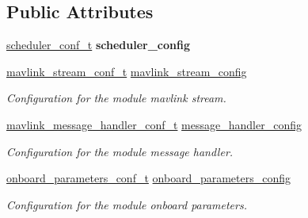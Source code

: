 \subsection*{Public Attributes}
\begin{DoxyCompactItemize}
\item 
\hypertarget{structmavlink__communication__conf__t_a91a616821d00de2f494815fb6c199c69}{\hyperlink{structscheduler__conf__t}{scheduler\+\_\+conf\+\_\+t} {\bfseries scheduler\+\_\+config}}\label{structmavlink__communication__conf__t_a91a616821d00de2f494815fb6c199c69}

\item 
\hypertarget{structmavlink__communication__conf__t_a72829ddb14533048c3fa186c352cb651}{\hyperlink{structmavlink__stream__conf__t}{mavlink\+\_\+stream\+\_\+conf\+\_\+t} \hyperlink{structmavlink__communication__conf__t_a72829ddb14533048c3fa186c352cb651}{mavlink\+\_\+stream\+\_\+config}}\label{structmavlink__communication__conf__t_a72829ddb14533048c3fa186c352cb651}

\begin{DoxyCompactList}\small\item\em Configuration for the module mavlink stream. \end{DoxyCompactList}\item 
\hypertarget{structmavlink__communication__conf__t_a508838ffec8764bd89d3028ef65bd963}{\hyperlink{structmavlink__message__handler__conf__t}{mavlink\+\_\+message\+\_\+handler\+\_\+conf\+\_\+t} \hyperlink{structmavlink__communication__conf__t_a508838ffec8764bd89d3028ef65bd963}{message\+\_\+handler\+\_\+config}}\label{structmavlink__communication__conf__t_a508838ffec8764bd89d3028ef65bd963}

\begin{DoxyCompactList}\small\item\em Configuration for the module message handler. \end{DoxyCompactList}\item 
\hypertarget{structmavlink__communication__conf__t_a1637ef0fa3ca36b09f611bc5071fb089}{\hyperlink{structonboard__parameters__conf__t}{onboard\+\_\+parameters\+\_\+conf\+\_\+t} \hyperlink{structmavlink__communication__conf__t_a1637ef0fa3ca36b09f611bc5071fb089}{onboard\+\_\+parameters\+\_\+config}}\label{structmavlink__communication__conf__t_a1637ef0fa3ca36b09f611bc5071fb089}

\begin{DoxyCompactList}\small\item\em Configuration for the module onboard parameters. \end{DoxyCompactList}\end{DoxyCompactItemize}


